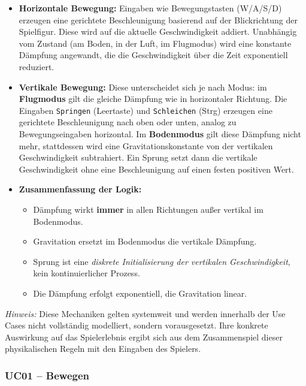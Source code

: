 \documentclass{article}
\begin{document}
\begin{itemize}
  \item \textbf{Horizontale Bewegung:}  Eingaben wie Bewegungstasten (W/A/S/D) erzeugen eine gerichtete Beschleunigung basierend auf der Blickrichtung der Spielfigur. Diese wird auf die aktuelle Geschwindigkeit addiert. Unabhängig vom Zustand (am Boden, in der Luft, im Flugmodus) wird eine konstante Dämpfung angewandt, die die Geschwindigkeit über die Zeit exponentiell reduziert.

  \item \textbf{Vertikale Bewegung:}  Diese unterscheidet sich je nach Modus: im \textbf{Flugmodus} gilt die gleiche Dämpfung wie in horizontaler Richtung. Die Eingaben \texttt{Springen} (Leertaste) und \texttt{Schleichen} (Strg) erzeugen eine gerichtete Beschleunigung nach oben oder unten, analog zu Bewegungseingaben horizontal. Im \textbf{Bodenmodus} gilt diese Dämpfung nicht mehr, stattdessen wird eine Gravitationskonstante von der vertikalen Geschwindigkeit subtrahiert. Ein Sprung setzt dann die vertikale Geschwindigkeit ohne eine Beschleunigung auf einen festen positiven Wert.

  \item \textbf{Zusammenfassung der Logik:}
  \begin{itemize}
    \item Dämpfung wirkt \textbf{immer} in allen Richtungen au\ss{}er vertikal im Bodenmodus.
    \item Gravitation ersetzt im Bodenmodus die vertikale Dämpfung.
    \item Sprung ist eine \textit{diskrete Initialisierung der vertikalen Geschwindigkeit}, kein kontinuierlicher Prozess.
    \item Die Dämpfung erfolgt exponentiell, die Gravitation linear.
  \end{itemize}
\end{itemize}

\textit{Hinweis:} Diese Mechaniken gelten systemweit und werden innerhalb der Use Cases nicht vollständig modelliert, sondern vorausgesetzt. Ihre konkrete Auswirkung auf das Spielerlebnis ergibt sich aus dem Zusammenspiel dieser physikalischen Regeln mit den Eingaben des Spielers.

\newpage

\subsubsection*{UC01 – Bewegen}
\end{document}
